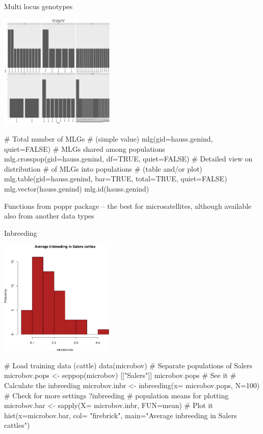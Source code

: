 \documentclass[compress, ucs, xelatex, 11pt, xcolor=svgnames,
  hyperref={
    bookmarks=true,
    unicode=true,
    colorlinks=true,
    pdftitle={Molecular data in R},
    plainpages=false,
    pdfauthor={Vojtech Zeisek},
    pdfsubject={Course about phylogeny and evolution in R},
    pdfcreator={XeLaTeX},
    pdfkeywords={R, evolution, phylogeny, molecular data},
    linkcolor=Tomato,
    anchorcolor=SaddleBrown,
    citecolor=Goldenrod,
    filecolor=DarkMagenta,
    menucolor=Sienna,
    urlcolor=DarkTurquoise,
    pdftex},
  url={hyphens, lowtilde} %
  ]{beamer}
\begin{document}
\begin{frame}[fragile]{Multi locus genotypes}
  \begin{multicols}{2}
  \includegraphics[height=5.5cm]{mlg.png}
  \begin{spluscode}
    # Total number of MLGs
    # (simple value)
    mlg(gid=hauss.genind, quiet=FALSE)
    # MLGs shared among populations
    mlg.crosspop(gid=hauss.genind,
      df=TRUE, quiet=FALSE)
    # Detailed view on distribution
    # of MLGs into populations
    # (table and/or plot)
    mlg.table(gid=hauss.genind,
      bar=TRUE, total=TRUE,
      quiet=FALSE)
    mlg.vector(hauss.genind)
    mlg.id(hauss.genind)
  \end{spluscode}
  \end{multicols}
  Functions from poppr package -- the best for microsatellites, although available also from another data types
\end{frame}

\begin{frame}[fragile]{Inbreeding}
\begin{multicols}{2}
  \includegraphics[height=5.5cm]{inbreeding.png}
  \begin{spluscode}
    # Load training data (cattle)
    data(microbov)
    # Separate populations of Salers
    microbov.pops <- seppop(microbov)
      [["Salers"]]
    microbov.pops # See it
    # Calculate the inbreeding
    microbov.inbr <- inbreeding(x=
      microbov.pops, N=100)
    # Check for more settings
    ?inbreeding
    # population means for plotting
    microbov.bar <- sapply(X=
      microbov.inbr, FUN=mean)
    # Plot it
    hist(x=microbov.bar, col=
      "firebrick", main="Average
      inbreeding in Salers cattles")
  \end{spluscode}
\end{multicols}

\end{frame}
\end{document}

